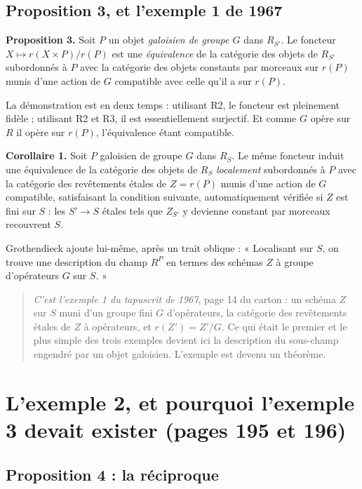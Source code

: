 \documentclass[11pt,a4paper]{article}
\begin{document}
\subsection*{Proposition 3, et l'exemple 1 de 1967}

\textbf{Proposition 3.} Soit $P$ un objet \emph{galoisien de groupe $G$} dans
$R_{S'}$. Le foncteur $X \mapsto r(X \times P)/r(P)$ est une \emph{équivalence}
de la catégorie des objets de $R_{S'}$ subordonnés à $P$ avec la catégorie des
objets constants par morceaux sur $r(P)$ munis d'une action de $G$ compatible
avec celle qu'il a sur $r(P)$.

La démonstration est en deux temps : utilisant R2, le foncteur est pleinement
fidèle ; utilisant R2 et R3, il est essentiellement surjectif. Et comme $G$
opère sur $R$ il opère sur $r(P)$, l'équivalence étant compatible.

\textbf{Corollaire 1.} Soit $P$ galoisien de groupe $G$ dans $R_{S}$. Le même
foncteur induit une équivalence de la catégorie des objets de $R_{S}$
\emph{localement} subordonnés à $P$ avec la catégorie des revêtements étales de
$Z = r(P)$ munis d'une action de $G$ compatible, satisfaisant la condition
suivante, automatiquement vérifiée si $Z$ est fini sur $S$ : les $S' \to S$
étales tels que $Z_{S'}$ y devienne constant par morceaux recouvrent $S$.

Grothendieck ajoute lui-même, après un trait oblique : « Localisant sur $S$, on
trouve une description du champ $R^{P}$ en termes des schémas $Z$ à groupe
d'opérateurs $G$ sur $S$. »

\begin{quote}
\emph{C'est l'exemple 1 du tapuscrit de 1967}, page 14 du carton : un schéma
$Z$ sur $S$ muni d'un groupe fini $G$ d'opérateurs, la catégorie des
revêtements étales de $Z$ à opérateurs, et $r(Z') = Z'/G$. Ce qui était le
premier et le plus simple des trois exemples devient ici la description du
sous-champ engendré par un objet galoisien. L'exemple est devenu un théorème.
\end{quote}

\section*{L'exemple 2, et pourquoi l'exemple 3 devait exister (pages 195 et 196)}

\subsection*{Proposition 4 : la réciproque}
\end{document}
